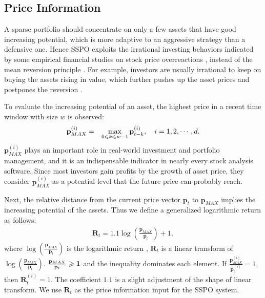 \documentclass[twoside,11pt]{article}
\begin{document}
\subsection{Price Information}
\label{sec:priceinfo}
A sparse portfolio should concentrate on only a few assets that have good increasing potential, which is more adaptive to an aggressive strategy than a defensive one. Hence SSPO exploits the irrational investing behaviors indicated by some empirical financial studies on stock price overreactions \citep{stockoverreact,behavioralfinance,shiller3}, instead of the mean reversion principle \citep{MR2}. For example, investors are usually irrational to keep on buying the assets rising in value, which further pushes up the asset prices and postpones the reversion \citep{trend0,irrationalexuberance}. 
 
To evaluate the increasing potential of an asset, the highest price in a recent time window with size $w$ is observed:
\begin{eqnarray}
\label{eqn:pp}
\mathbf{p}_{MAX}^{(i)}&=& \max_{0\leqslant k\leqslant w-1} \mathbf{p}_{t-k}^{(i)}, \quad i=1,2,\cdots, d.
\end{eqnarray}
$\mathbf{p}_{MAX}^{(i)}$ plays an important role in real-world investment and portfolio management, and it is an indispensable indicator in nearly every stock analysis software. Since most investors gain profits by the growth of asset price, they consider $\mathbf{p}_{MAX}^{(i)}$ as a potential level that the future price can probably reach.

Next, the relative distance from the current price vector $\mathbf{p}_{t}$ to $\mathbf{p}_{MAX}$ implies the increasing potential of the assets. Thus we define a generalized logarithmic return as follows:
\begin{eqnarray}
\label{eqn:genreturnrate}
\mathbf{R}_t=1.1\log \left(\frac{\mathbf{p}_{MAX}}{\mathbf{p}_{t}}\right)+1,
\end{eqnarray}
where $\log \left(\frac{\mathbf{p}_{MAX}}{\mathbf{p}_{t}}\right)$ is the logarithmic return \citep{anticor}, $\mathbf{R}_t$ is a linear transform of $\log \left(\frac{\mathbf{p}_{MAX}}{\mathbf{p}_{t}}\right)$. $\frac{\mathbf{p}_{MAX}}{\mathbf{p}_{t}}\geqslant \mathbf{1}$ and the inequality dominates each element. If $\frac{\mathbf{p}_{MAX}^{(i)}}{\mathbf{p}_{t}^{(i)}}= 1$, then $\mathbf{R}_t^{(i)}=1$. The coefficient $1.1$ is a slight adjustment of the shape of linear transform. We use $\mathbf{R}_t$ as the price information input for the SSPO system.
\end{document}
